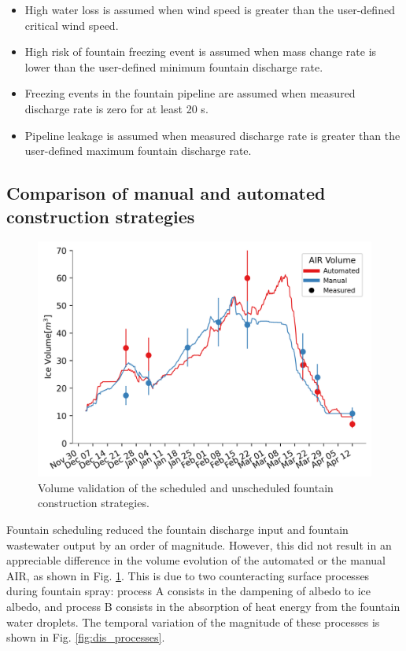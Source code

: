 \begin{itemize}

	\item High water loss is assumed when wind speed is greater than the user-defined critical wind speed.

	\item High risk of fountain freezing event is assumed when mass change rate is lower than the user-defined minimum fountain discharge rate.

	\item Freezing events in the fountain pipeline are assumed when measured discharge rate is zero for at least 20 s.

	\item Pipeline leakage is assumed when measured discharge rate is greater than the user-defined maximum fountain discharge rate.

\end{itemize}

\subsection{Comparison of manual and automated construction strategies}

\begin{figure}[htb] \includegraphics[width=\textwidth] {figs/CH_validation.png} \caption{Volume validation of the
		scheduled and unscheduled fountain construction strategies.} \label{fig:validation} \end{figure}

Fountain scheduling reduced the fountain discharge input and fountain wastewater output by an order of
magnitude. However, this did not result in an appreciable difference in the volume evolution of the automated
or the manual AIR, as shown in Fig. \ref{fig:validation}. This is due to two counteracting surface processes
during fountain spray: process A consists in the dampening of albedo to ice albedo, and process B consists in the
absorption of heat energy from the fountain water droplets. The temporal variation of the magnitude of these
processes is shown in Fig. \ref{fig:dis_processes}.

